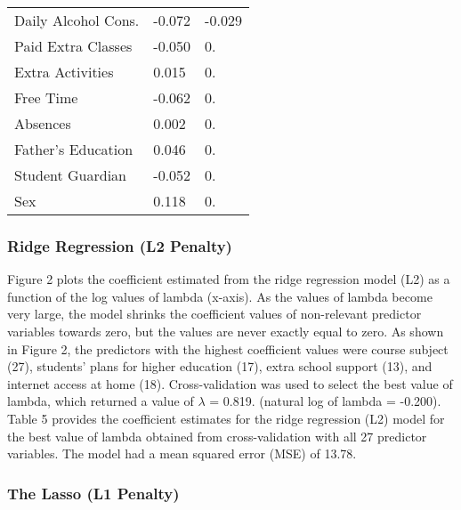 \documentclass[sigconf]{acmart}
\begin{document}
\begin{table}
\begin{tabular}{lll}
    Daily Alcohol Cons. &   -0.072      &   -0.029   \\ 
    Paid Extra Classes  &   -0.050      &    0.   \\      
    Extra Activities    &    0.015      &    0.   \\    
    Free Time           &   -0.062      &    0.   \\    
    Absences            &    0.002      &    0.   \\
    Father's Education  &    0.046      &    0.   \\         
    Student Guardian    &   -0.052      &    0.   \\    
    Sex                 &    0.118      &    0.   \\
    \bottomrule
  \end{tabular}
\end{table}


\subsubsection{Ridge Regression (L2 Penalty)}

Figure 2 plots the coefficient estimated from the ridge regression model (L2) 
as a function of the log values of lambda (x-axis). As the values of lambda 
become very large, the model shrinks the coefficient values of non-relevant 
predictor variables towards zero, but the values are never exactly equal to 
zero. As shown in Figure 2, the predictors with the highest coefficient values 
were course subject (27), students' plans for higher education (17), extra 
school support (13), and internet access at home (18). Cross-validation was 
used to select the best value of lambda, which returned a value of $\lambda$ = 0.819. (natural log of lambda =
-0.200). Table 5 provides the coefficient estimates for the ridge regression 
(L2) model for the best value of lambda obtained from cross-validation with
all 27 predictor variables. The model had a mean squared error (MSE) of 13.78. 


\subsubsection{The Lasso (L1 Penalty)}
\end{document}
